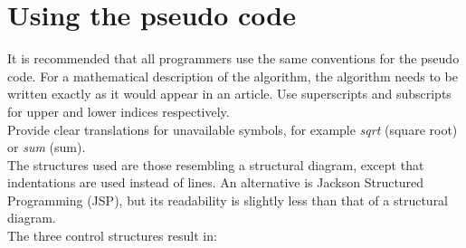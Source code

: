 \documentclass[12pt]{book}
\begin{document}
 \label{ch:pseudo}

\section{Using the pseudo code}

It is recommended that all programmers use the same conventions for the pseudo code. For
a mathematical description of the algorithm, the algorithm needs to be written exactly as
it would appear in an article. Use superscripts and subscripts for upper and lower indices
respectively.
\\[2ex]
\noindent
Provide clear translations for unavailable symbols, for example \textit{sqrt} (square root) or \textit{sum} (sum).
\\[2ex]
\noindent
The structures used are those resembling a structural diagram, except that indentations are
used instead of lines. An alternative is Jackson Structured Programming (JSP), but its
readability is slightly less than that of a structural diagram.\\
The three control structures result in:
\end{document}
